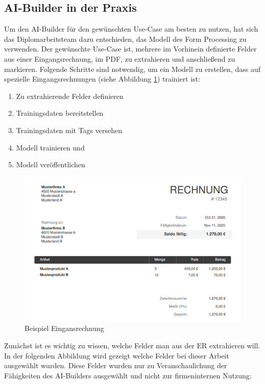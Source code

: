 \subsection{AI-Builder in der Praxis}

Um den AI-Builder für den gewünschten Use-Case am besten zu nutzen, hat sich das Diplomarbeitsteam dazu entschieden, das Modell des Form Processing zu verwenden. Der gewünschte Use-Case ist, mehrere im Vorhinein definierte Felder aus einer Eingangsrechnung, im PDF, zu extrahieren und anschließend zu markieren. Folgende Schritte sind notwendig, um ein Modell zu erstellen, dass auf spezielle Eingangsrechnungen (siehe Abbildung \ref{fig:example-invoice-figure}) trainiert ist:

\begin{enumerate}
    \item Zu extrahierende Felder definieren
    \item Trainingsdaten bereitstellen
    \item Trainingsdaten mit Tags versehen
    \item Modell trainieren und
    \item Modell veröffentlichen
\end{enumerate}

\begin{figure}[h]
    \centering
    \includegraphics[scale=0.9]{sections/cloud-computing/images/example-invoice.png}
    \caption{Beispiel Eingansrechnung}
    \label{fig:example-invoice-figure}
\end{figure}

Zunächst ist es wichtig zu wissen, welche Felder man aus der ER extrahieren will. In der folgenden Abbildung wird gezeigt welche Felder bei dieser Arbeit ausgewählt wurden. Diese Felder wurden nur zu Veranschaulichung der Fähigkeiten des AI-Builders ausgewählt und nicht zur firmeninternen Nutzung:

